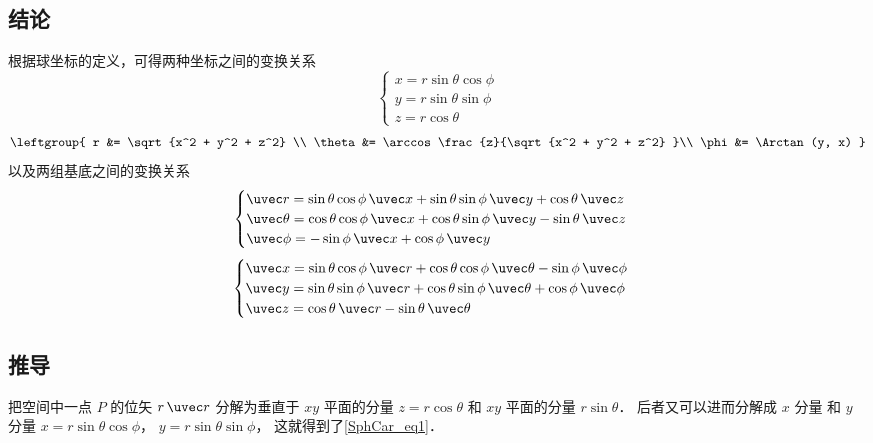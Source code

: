 

\subsection{结论}
根据球坐标的定义，可得两种坐标之间的变换关系
\begin{equation}\label{SphCar_eq1}
\begin{cases}
x = r\sin \theta \cos \phi \\
y = r\sin \theta \sin \phi \\
z = r\cos \theta 
\end{cases}
\end{equation}
\begin{equation}\label{SphCar_eq2}
\leftgroup{
r &= \sqrt {x^2 + y^2 + z^2} \\
\theta  &= \arccos \frac{z}{\sqrt{x^2 + y^2 + z^2} }\\
\phi  &= \Arctan(y, x)
}\end{equation}
以及两组基底之间的变换关系
\begin{equation}\label{SphCar_eq3}
\begin{cases}
\uvec r = \sin\theta\cos\phi\,\uvec x + \sin\theta\sin\phi\,\uvec y + \cos\theta\,\uvec z\\
\uvec \theta = \cos\theta\cos\phi\,\uvec x + \cos\theta\sin\phi\,\uvec y - \sin\theta\,\uvec z\\
\uvec \phi =  - \sin\phi\,\uvec x + \cos\phi\,\uvec y
\end{cases}
\end{equation}
\begin{equation}\label{SphCar_eq4}
\begin{cases}
\uvec x = \sin \theta \cos \phi \,\uvec r + \cos \theta \cos \phi \,\uvec \theta  - \sin \phi \,\uvec \phi \\
\uvec y = \sin \theta \sin \phi \,\uvec r + \cos \theta \sin \phi \,\uvec \theta  + \cos \phi \,\uvec \phi \\
\uvec z = \cos \theta \,\uvec r - \sin \theta \,\uvec \theta
\end{cases}
\end{equation}

\subsection{推导}
把空间中一点 $P$ 的位矢 $r \,\uvec r$ 分解为垂直于 $xy$ 平面的分量 $z = r\cos \theta $ 和 $xy$ 平面的分量 $r\sin \theta $． 后者又可以进而分解成 $x$ 分量 和 $y$ 分量  $x = r\sin \theta \cos \phi$，  $y = r\sin \theta \sin \phi$， 这就得到了\autoref{SphCar_eq1}．

